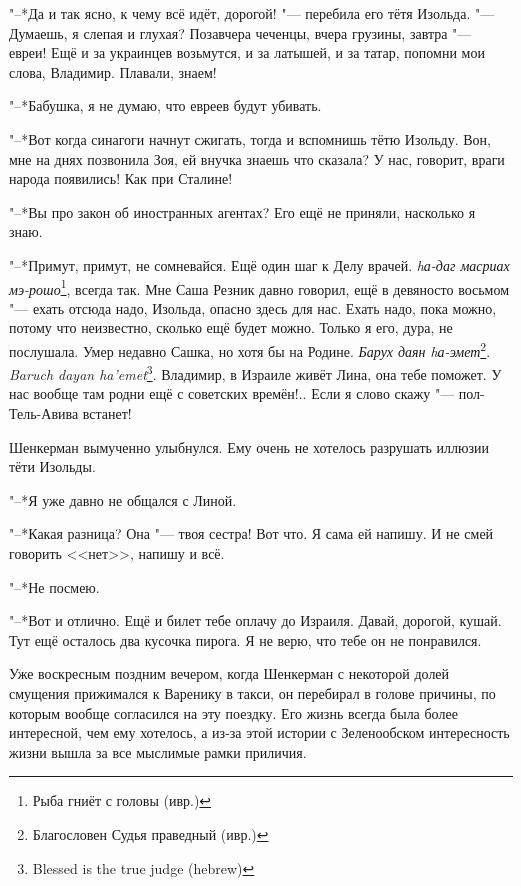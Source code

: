 "--*Да и так ясно, к чему всё идёт, дорогой! "--- перебила его тётя Изольда.
"--- Думаешь, я слепая и глухая?
Позавчера чеченцы, вчера грузины, завтра "--- евреи!
Ещё и за украинцев возьмутся, и за латышей, и за татар, попомни мои слова, Владимир.
Плавали, знаем!

"--*Бабушка, я не думаю, что евреев будут убивать.

"--*Вот когда синагоги начнут сжигать, тогда и вспомнишь тётю Изольду.
Вон, мне на днях позвонила Зоя, ей внучка знаешь что сказала?
У нас, говорит, враги народа появились!
Как при Сталине!

"--*Вы про закон об иностранных агентах?
Его ещё не приняли, насколько я знаю.

"--*Примут, примут, не сомневайся.
Ещё один шаг к Делу врачей.
\textit{hа-даг масриах мэ-рошо}\footnote{Рыба гниёт с головы (ивр.)}, всегда так.
Мне Саша Резник давно говорил, ещё в девяносто восьмом "--- ехать отсюда надо, Изольда, опасно здесь для нас.
Ехать надо, пока можно, потому что неизвестно, сколько ещё будет можно.
Только я его, дура, не послушала.
Умер недавно Сашка, но хотя бы на Родине.
{\textit{Барух даян hа-эмет}\footnote{Благословен Судья праведный (ивр.)}.}
{\textit{Baruch dayan ha'emet}\footnote{Blessed is the true judge (hebrew)}.}
Владимир, в Израиле живёт Лина, она тебе поможет.
У нас вообще там родни ещё с советских времён!..
Если я слово скажу "--- пол-Тель-Авива встанет!

Шенкерман вымученно улыбнулся.
Ему очень не хотелось разрушать иллюзии тёти Изольды.

"--*Я уже давно не общался с Линой.

"--*Какая разница?
Она "--- твоя сестра!
Вот что.
Я сама ей напишу.
И не смей говорить <<нет>>, напишу и всё.

"--*Не посмею.

"--*Вот и отлично.
Ещё и билет тебе оплачу до Израиля.
Давай, дорогой, кушай.
Тут ещё осталось два кусочка пирога.
Я не верю, что тебе он не понравился.

\textspace

\asterism

\label{Sun_2012_07_22}

Уже воскресным поздним вечером, когда Шенкерман с некоторой долей смущения прижимался к Варенику в такси, он перебирал в голове причины, по которым вообще согласился на эту поездку.
Его жизнь всегда была более интересной, чем ему хотелось, а из-за этой истории с Зеленообском интересность жизни вышла за все мыслимые рамки приличия.

